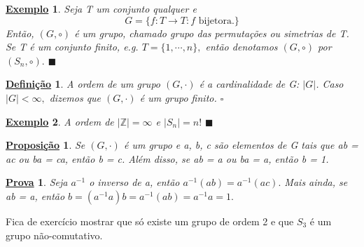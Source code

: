 \documentclass{article}
\newtheorem*{def*}{\underline{Defini\c c\~ao}}
\newtheorem*{prop*}{\underline{Proposi\c c\~ao}}
\newtheorem{example*}{\underline{Exemplo}}
\newtheorem*{proof*}{\underline{Prova}}
\renewcommand\qedsymbol{$\blacksquare$}
\begin{document}
\begin{example*}
  Seja T um conjunto qualquer e 
  $$
    G = \{f:T\rightarrow T: f \text{ bijetora.}\}
  $$
  Ent\~ao, $(G, \circ)$ \'e um grupo, chamado grupo das permuta\c c\~oes ou simetrias de T. Se T \'e um conjunto finito, e.g.
  $T = \{1, \cdots, n\}, $ ent\~ao denotamos $(G, \circ)$ por $(S_{n}, \circ).$ \qedsymbol
\end{example*}
\begin{def*}
  A ordem de um grupo $(G, \cdot)$ \'e a cardinalidade de G: $|G|$. Caso $|G| < \infty,$ dizemos que $(G, \cdot)$ \'e um grupo finito. $\square$
\end{def*}
\begin{example*}
  A ordem de $|\mathbb{Z}| = \infty$ e $|S_{n}| = n!$ \qedsymbol
\end{example*}
\begin{prop*}
  Se $(G, \cdot)$ \'e um grupo e a, b, c s\~ao elementos de G tais que ab = ac ou ba = ca, ent\~ao b = c. Al\'em disso, se ab = a ou
ba = a, ent\~ao b = 1.
\end{prop*}
\begin{proof*}
  Seja $a^{-1}$ o inverso de a, ent\~ao $a^{-1}(ab) = a^{-1}(ac).$ Mais ainda, se ab = a, ent\~ao $b = (a^{-1}a)b = a^{-1}(ab) = a^{-1}a = 1.$
\end{proof*}
  Fica de exerc\'icio mostrar que s\'o existe um grupo de ordem 2 e que $S_{3}$ \'e um grupo n\~ao-comutativo.
\end{document}
